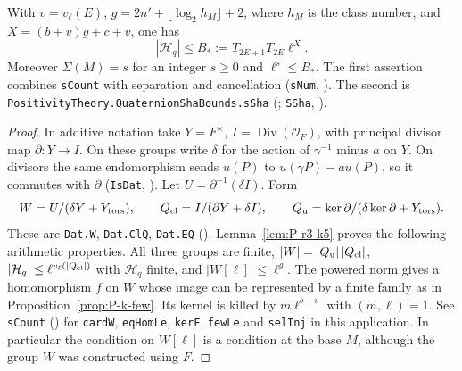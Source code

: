 \begin{proposition}\label{prop:P-k-count}
With $v=v_\ell(E)$, $g=2n'+\lfloor\log_2 h_M\rfloor+2$, where $h_M$ is
the class number, and $X=(b+v)g+c+v$, one has
\[
 |\mathcal H_q|\le B_*:=T_{2E+1}T_{2E}\ell^X.
\]
Moreover $\Sigma(M)=s$ for an integer $s\ge0$ and $\ell^s\le B_*$.
The first assertion combines \nolinkurl{sCount} with separation
and cancellation (\nolinkurl{sNum}, ).
The second is \nolinkurl{PositivityTheory.QuaternionShaBounds.sSha}
(;
\nolinkurl{SSha}, ).
\end{proposition}
\begin{proof}
In additive notation take $Y=F^\times$, $I=\operatorname{Div}(\mathcal O_F)$,
with principal divisor map $\partial:Y\to I$. On these groups write
$\delta$ for the action of $\gamma^{-1}$ minus $a$ on $Y$.
On divisors the same endomorphism sends $u(P)$ to $u(\gamma P)-a u(P)$,
so it commutes with $\partial$ (\nolinkurl{IsDat}, ).
Let $U=\partial^{-1}(\delta I)$. Form
\[
 W=U/(\delta Y+Y_{\rm tors}),\qquad
 Q_{\rm cl}=I/(\partial Y+\delta I),\qquad
 Q_{\rm u}=\ker\partial/(\delta\ker\partial+Y_{\rm tors}).
\]
These are \nolinkurl{Dat.W}, \nolinkurl{Dat.ClQ}, \nolinkurl{Dat.EQ}
().
Lemma~\ref{lem:P-r3-k5} proves the following arithmetic properties.
All three groups are finite,
$|W|=|Q_{\rm u}|\,|Q_{\rm cl}|$,
$|\mathcal H_q|\le\ell^{v_\ell(|Q_{\rm cl}|)}$ with $\mathcal H_q$ finite,
and $|W[\ell]|\le\ell^g$. The powered norm gives a homomorphism $f$ on
$W$ whose image can be represented by a finite family as in
Proposition~\ref{prop:P-k-few}. Its kernel is killed by
$m\ell^{b+v}$ with $(m,\ell)=1$. See \nolinkurl{sCount}
() for \nolinkurl{cardW},
\nolinkurl{eqHomLe}, \nolinkurl{kerF}, \nolinkurl{fewLe} and
\nolinkurl{selInj} in this application. In particular the condition
on $W[\ell]$ is a condition at the base $M$, although the group $W$ was
constructed using $F$.


\end{proof}
